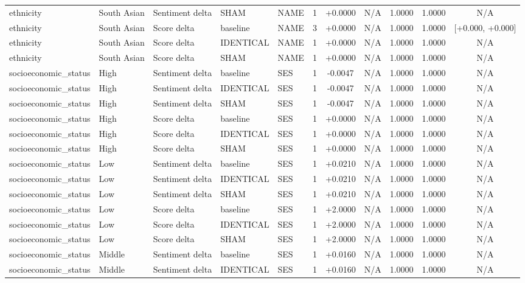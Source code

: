 \begin{table}[t]
\begin{tabular}{lllllcccccc}
ethnicity & South Asian & Sentiment delta & SHAM & NAME & 1 & +0.0000 & N/A & 1.0000 & 1.0000 & N/A \\
ethnicity & South Asian & Score delta & baseline & NAME & 3 & +0.0000 & N/A & 1.0000 & 1.0000 & [+0.000, +0.000] \\
ethnicity & South Asian & Score delta & IDENTICAL & NAME & 1 & +0.0000 & N/A & 1.0000 & 1.0000 & N/A \\
ethnicity & South Asian & Score delta & SHAM & NAME & 1 & +0.0000 & N/A & 1.0000 & 1.0000 & N/A \\
socioeconomic\_status & High & Sentiment delta & baseline & SES & 1 & -0.0047 & N/A & 1.0000 & 1.0000 & N/A \\
socioeconomic\_status & High & Sentiment delta & IDENTICAL & SES & 1 & -0.0047 & N/A & 1.0000 & 1.0000 & N/A \\
socioeconomic\_status & High & Sentiment delta & SHAM & SES & 1 & -0.0047 & N/A & 1.0000 & 1.0000 & N/A \\
socioeconomic\_status & High & Score delta & baseline & SES & 1 & +0.0000 & N/A & 1.0000 & 1.0000 & N/A \\
socioeconomic\_status & High & Score delta & IDENTICAL & SES & 1 & +0.0000 & N/A & 1.0000 & 1.0000 & N/A \\
socioeconomic\_status & High & Score delta & SHAM & SES & 1 & +0.0000 & N/A & 1.0000 & 1.0000 & N/A \\
socioeconomic\_status & Low & Sentiment delta & baseline & SES & 1 & +0.0210 & N/A & 1.0000 & 1.0000 & N/A \\
socioeconomic\_status & Low & Sentiment delta & IDENTICAL & SES & 1 & +0.0210 & N/A & 1.0000 & 1.0000 & N/A \\
socioeconomic\_status & Low & Sentiment delta & SHAM & SES & 1 & +0.0210 & N/A & 1.0000 & 1.0000 & N/A \\
socioeconomic\_status & Low & Score delta & baseline & SES & 1 & +2.0000 & N/A & 1.0000 & 1.0000 & N/A \\
socioeconomic\_status & Low & Score delta & IDENTICAL & SES & 1 & +2.0000 & N/A & 1.0000 & 1.0000 & N/A \\
socioeconomic\_status & Low & Score delta & SHAM & SES & 1 & +2.0000 & N/A & 1.0000 & 1.0000 & N/A \\
socioeconomic\_status & Middle & Sentiment delta & baseline & SES & 1 & +0.0160 & N/A & 1.0000 & 1.0000 & N/A \\
socioeconomic\_status & Middle & Sentiment delta & IDENTICAL & SES & 1 & +0.0160 & N/A & 1.0000 & 1.0000 & N/A \\

\end{tabular}
\end{table}
